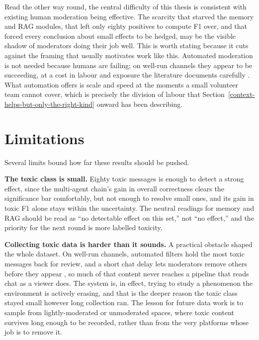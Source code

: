 Read the other way round, the central difficulty of this thesis is consistent with existing human moderation being effective. The scarcity that starved the memory and RAG modules, that left only eighty positives to compute F1 over, and that forced every conclusion about small effects to be hedged, may be the visible shadow of moderators doing their job well. This is worth stating because it cuts against the framing that usually motivates work like this. Automated moderation is not needed because humans are failing; on well-run channels they appear to be succeeding, at a cost in labour and exposure the literature documents carefully \citep{roberts2019behindscreen, wohn2019volunteer}. What automation offers is scale and speed at the moments a small volunteer team cannot cover, which is precisely the division of labour that Section~\ref{context-helps-but-only-the-right-kind} onward has been describing.

\section{Limitations}\label{limitations}

Several limits bound how far these results should be pushed.

\textbf{The toxic class is small.} Eighty toxic messages is enough to detect a strong effect, since the multi-agent chain's gain in overall correctness clears the significance bar comfortably, but not enough to resolve small ones, and its gain in toxic F1 alone stays within the uncertainty. The neutral readings for memory and RAG should be read as ``no detectable effect on this set,'' not ``no effect,'' and the priority for the next round is more labelled toxicity.

\textbf{Collecting toxic data is harder than it sounds.} A practical obstacle shaped the whole dataset. On well-run channels, automated filters hold the most toxic messages back for review, and a short chat delay lets moderators remove others before they appear \citep{youtubelivechat2026, twitchapi2026}, so much of that content never reaches a pipeline that reads chat as a viewer does. The system is, in effect, trying to study a phenomenon the environment is actively erasing, and that is the deeper reason the toxic class stayed small however long collection ran. The lesson for future data work is to sample from lightly-moderated or unmoderated spaces, where toxic content survives long enough to be recorded, rather than from the very platforms whose job is to remove it.

